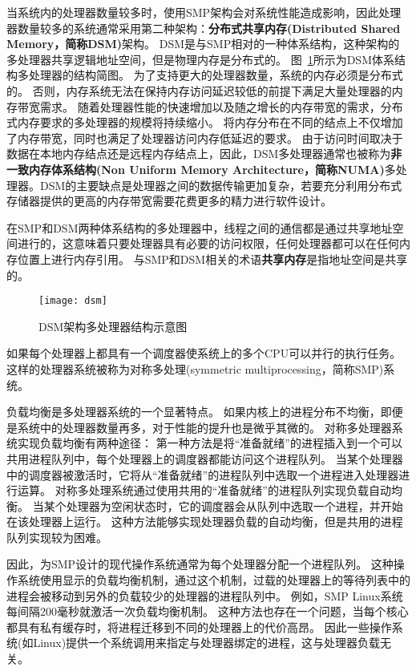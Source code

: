 	当系统内的处理器数量较多时，使用SMP架构会对系统性能造成影响，因此处理器数量较多的系统通常采用第二种架构：\textbf{分布式共享内存(Distributed Shared Memory，简称DSM)}架构。
	DSM是与SMP相对的一种体系结构，这种架构的多处理器共享逻辑地址空间，但是物理内存是分布式的。
	图~\ref{fig:dsm}所示为DSM体系结构多处理器的结构简图。
	为了支持更大的处理器数量，系统的内存必须是分布式的。
	否则，内存系统无法在保持内存访问延迟较低的前提下满足大量处理器的内存带宽需求。
	随着处理器性能的快速增加以及随之增长的内存带宽的需求，分布式内存要求的多处理器的规模将持续缩小。
	将内存分布在不同的结点上不仅增加了内存带宽，同时也满足了处理器访问内存低延迟的要求。
	由于访问时间取决于数据在本地内存结点还是远程内存结点上，因此，DSM多处理器通常也被称为\textbf{非一致内存体系结构(Non Uniform Memory Architecture，简称NUMA)}多处理器。DSM的主要缺点是处理器之间的数据传输更加复杂，若要充分利用分布式存储器提供的更高的内存带宽需要花费更多的精力进行软件设计。

在SMP和DSM两种体系结构的多处理器中，线程之间的通信都是通过共享地址空间进行的，这意味着只要处理器具有必要的访问权限，任何处理器都可以在任何内存位置上进行内存引用。
与SMP和DSM相关的术语\textbf{共享内存}是指地址空间是共享的。

\begin{figure}
\centering
\texttt{[image: dsm]}
\caption{DSM架构多处理器结构示意图}
\label{fig:dsm}
\end{figure}


如果每个处理器上都具有一个调度器使系统上的多个CPU可以并行的执行任务。
这样的处理器系统被称为对称多处理(symmetric multiprocessing，简称SMP)系统。

负载均衡是多处理器系统的一个显著特点。
如果内核上的进程分布不均衡，即便是系统中的处理器数量再多，对于性能的提升也是微乎其微的。
对称多处理器系统实现负载均衡有两种途径：
第一种方法是将“准备就绪”的进程插入到一个可以共用进程队列中，每个处理器上的调度器都能访问这个进程队列。
当某个处理器中的调度器被激活时，它将从“准备就绪”的进程队列中选取一个进程进入处理器进行运算。
对称多处理系统通过使用共用的“准备就绪”的进程队列实现负载自动均衡。
当某个处理器为空闲状态时，它的调度器会从队列中选取一个进程，并开始在该处理器上运行。
这种方法能够实现处理器负载的自动均衡，但是共用的进程队列实现较为困难。

因此，为SMP设计的现代操作系统通常为每个处理器分配一个进程队列。
这种操作系统使用显示的负载均衡机制，通过这个机制，过载的处理器上的等待列表中的进程会被移动到另外的负载较少的处理器的进程队列中。
例如，SMP Linux系统每间隔200毫秒就激活一次负载均衡机制\cite{bolla2008effective}。
这种方法也存在一个问题，当每个核心都具有私有缓存时，将进程迁移到不同的处理器上的代价高昂。
因此一些操作系统(如Linux)提供一个系统调用来指定与处理器绑定的进程，这与处理器负载无关。

